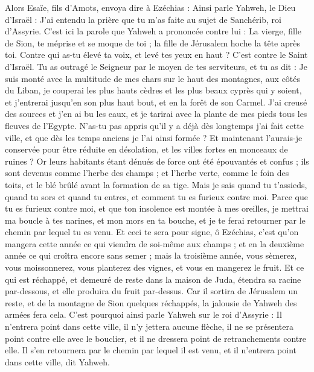 \begin{multicols}{2}
Alors Esaïe, fils d'Amots, envoya dire à Ezéchias : Ainsi parle Yahweh, le Dieu d'Israël : J'ai entendu la prière que tu m'as faite au sujet de Sanchérib, roi d'Assyrie.
C'est ici la parole que Yahweh a prononcée contre lui : La vierge, fille de Sion, te méprise et se moque de toi ; la fille de Jérusalem hoche la tête après toi.
Contre qui as-tu élevé ta voix, et levé tes yeux en haut ? C'est contre le Saint d'Israël.
Tu as outragé le Seigneur par le moyen de tes serviteurs, et tu as dit : Je suis monté avec la multitude de mes chars sur le haut des montagnes, aux côtés du Liban, je couperai les plus hauts cèdres et les plus beaux cyprès qui y soient, et j'entrerai jusqu'en son plus haut bout, et en la forêt de son Carmel.
J'ai creusé des sources et j'en ai bu les eaux, et je tarirai avec la plante de mes pieds tous les fleuves de l'Egypte.
N'as-tu pas appris qu'il y a déjà dès longtemps j'ai fait cette ville, et que dès les temps anciens je l'ai ainsi formée ? Et maintenant l'aurais-je conservée pour être réduite en désolation, et les villes fortes en monceaux de ruines ?
Or leurs habitants étant dénués de force ont été épouvantés et confus ; ils sont devenus comme l'herbe des champs ; et l'herbe verte, comme le foin des toits, et le blé brûlé avant la formation de sa tige.
Mais je sais quand tu t'assieds, quand tu sors et quand tu entres, et comment tu es furieux contre moi.
Parce que tu es furieux contre moi, et que ton insolence est montée à mes oreilles, je mettrai ma boucle à tes narines, et mon mors en ta bouche, et je te ferai retourner par le chemin par lequel tu es venu.
Et ceci te sera pour signe, ô Ezéchias, c'est qu'on mangera cette année ce qui viendra de soi-même aux champs ; et en la deuxième année ce qui croîtra encore sans semer ; mais la troisième année, vous sèmerez, vous moissonnerez, vous planterez des vignes, et vous en mangerez le fruit.
Et ce qui est réchappé, et demeuré de reste dans la maison de Juda, étendra sa racine par-dessous, et elle produira du fruit par-dessus.
Car il sortira de Jérusalem un reste, et de la montagne de Sion quelques réchappés, la jalousie de Yahweh des armées fera cela.
C'est pourquoi ainsi parle Yahweh sur le roi d'Assyrie : Il n'entrera point dans cette ville, il n'y jettera aucune flèche, il ne se présentera point contre elle avec le bouclier, et il ne dressera point de retranchements contre elle.
Il s'en retournera par le chemin par lequel il est venu, et il n'entrera point dans cette ville, dit Yahweh.

\end{multicols}
